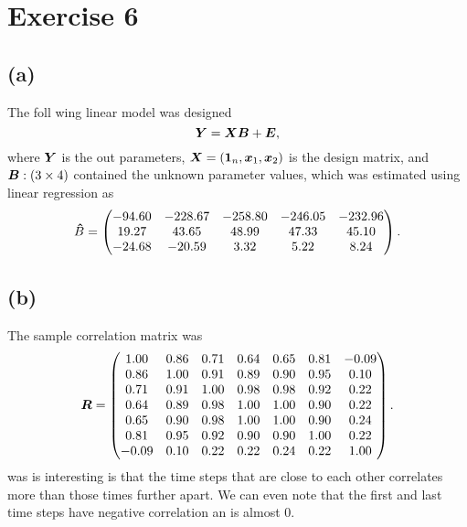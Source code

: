 
\section*{Exercise 6}
\label{sec:exercise-6}

\subsection*{(a)}
\label{sec:a-5}


The foll wing linear model was designed
\begin{equation*}
  \bm{Y} = \bm{XB} + \bm{E},
\end{equation*}
where $\bm{Y}$ is the out parameters, $\bm{X} = (\bm{1}_n, \bm{x}_1, \bm{x}_2)$
is the design matrix, and $\bm{B}:(3 \times 4) $ contained the unknown parameter values, which
was estimated using linear regression as
\begin{equation*}
  \bm{\hat} B =
  \begin{pmatrix}
    -94.60 &-228.67 &-258.80 &-246.05 &-232.96 \\ 
    19.27 &43.65 &48.99 &47.33 &45.10 \\ 
    -24.68 &-20.59 &3.32 &5.22 &8.24 
  \end{pmatrix}.
\end{equation*}

\subsection*{(b)}
The sample correlation matrix was 
\begin{equation*}
  \bm{R} =
  \begin{pmatrix}
    1.00 &0.86 &0.71 &0.64 &0.65 &0.81 &-0.09 \\ 
    0.86 &1.00 &0.91 &0.89 &0.90 &0.95 &0.10 \\ 
    0.71 &0.91 &1.00 &0.98 &0.98 &0.92 &0.22 \\ 
    0.64 &0.89 &0.98 &1.00 &1.00 &0.90 &0.22 \\ 
    0.65 &0.90 &0.98 &1.00 &1.00 &0.90 &0.24 \\ 
    0.81 &0.95 &0.92 &0.90 &0.90 &1.00 &0.22 \\ 
    -0.09 &0.10 &0.22 &0.22 &0.24 &0.22 &1.00  
  \end{pmatrix}.
\end{equation*}
was is interesting is that the time steps that are close to each other
correlates more than those times further apart. We can even note that
the first and last time steps have negative correlation an is almost 0.

